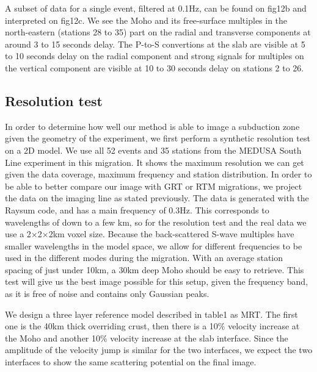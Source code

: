 \documentclass[9pt,a4paper]{article}
\numberwithin{equation}{section}
\begin{document}
\begin{multicols}{2}
A subset of data for a single event, filtered at 0.1Hz, can be found on fig12b and interpreted on fig12c.
We see the Moho and its free-surface multiples in the north-eastern (stations 28 to 35) part on the radial and transverse components at around 3 to 15 seconds delay.
The P-to-S convertions at the slab are visible at 5 to 10 seconds delay on the radial component and strong signals for multiples on the vertical component are visible at 10 to 30 seconds delay on stations 2 to 26.

\subsection{Resolution test}

In order to determine how well our method is able to image a subduction zone given the geometry of the experiment, we first perform a synthetic resolution test on a 2D model.
We use all 52 events and 35 stations from the MEDUSA South Line experiment in this migration.
It shows the maximum resolution we can get given the data coverage, maximum frequency and station distribution.
In order to be able to better compare our image with GRT or RTM migrations, we project the data on the imaging line as stated previously.
The data is generated with the Raysum code, and has a main frequency of 0.3Hz.
This corresponds to wavelengths of down to a few km, so for the resolution test and the real data we use a 2$\times$2$\times$2km voxel size.
Because the back-scattered S-wave multiples have smaller wavelengths in the model space, we allow for different frequencies to be used in the different modes during the migration.
With an average station spacing of just under 10km, a 30km deep Moho should be easy to retrieve.
This test will give us the best image possible for this setup, given the frequency band, as it is free of noise and contains only Gaussian peaks. 

We design a three layer reference model described in table1 as MRT.
The first one is the 40km thick overriding crust, then there is a 10\% velocity increase at the Moho and another 10\% velocity increase at the slab interface.
Since the amplitude of the velocity jump is similar for the two interfaces, we expect the two interfaces to show the same scattering potential on the final image.


\end{multicols}
\end{document}
